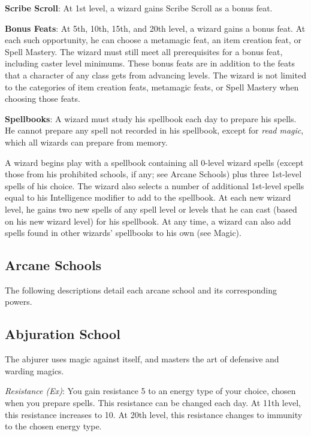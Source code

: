 \textbf{Scribe Scroll}: At 1st level, a wizard gains Scribe Scroll as a bonus feat. 
				
\textbf{Bonus Feats}: At 5th, 10th, 15th, and 20th level, a wizard gains a bonus feat. At each such opportunity, he can choose a metamagic feat, an item creation feat, or Spell Mastery. The wizard must still meet all prerequisites for a bonus feat, including caster level minimums. These bonus feats are in addition to the feats that a character of any class gets from advancing levels. The wizard is not limited to the categories of item creation feats, metamagic feats, or Spell Mastery when choosing those feats.
				
\textbf{Spellbooks}: A wizard must study his spellbook each day to prepare his spells. He cannot prepare any spell not recorded in his spellbook, except for \textit{read magic}, which all wizards can prepare from memory.
				
A wizard begins play with a spellbook containing all 0-level wizard spells (except those from his prohibited schools, if any; see Arcane Schools) plus three 1st-level spells of his choice. The wizard also selects a number of additional 1st-level spells equal to his Intelligence modifier to add to the spellbook. At each new wizard level, he gains two new spells of any spell level or levels that he can cast (based on his new wizard level) for his spellbook. At any time, a wizard can also add spells found in other wizards' spellbooks to his own (see Magic).
				
\subsection{Arcane Schools}

				
The following descriptions detail each arcane school and its corresponding powers.
				
\subsection{Abjuration School}

				
The abjurer uses magic against itself, and masters the art of defensive and warding magics.
				
\textit{Resistance (Ex)}: You gain resistance 5 to an energy type of your choice, chosen when you prepare spells. This resistance can be changed each day. At 11th level, this resistance increases to 10. At 20th level, this resistance changes to immunity to the chosen energy type.
				
